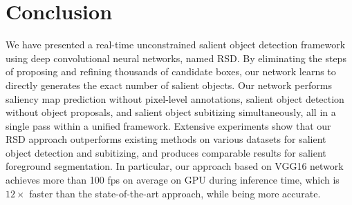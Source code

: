 \documentclass[10pt,twocolumn,letterpaper]{article}
\begin{document}
\section{Conclusion}

We have presented a real-time unconstrained salient object detection framework using deep convolutional neural networks, named RSD. 
By eliminating the steps of proposing and refining thousands of candidate boxes, our network learns to directly generates the exact number of salient objects. 
Our network performs saliency map prediction without pixel-level annotations, salient object detection without object proposals, and salient object subitizing simultaneously, all in a single pass within a unified framework.
Extensive experiments show that our RSD approach outperforms existing methods on various datasets for salient object detection and subitizing, and produces comparable results for salient foreground segmentation. In particular, our approach based on VGG16 network achieves more than 100 fps on average on GPU during inference time, which is $12\times$ faster than the state-of-the-art approach, while being more accurate.



{\small


}
\end{document}
